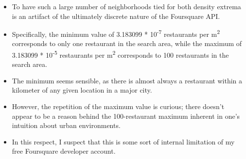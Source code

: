 \documentclass[aspectratio=169]{beamer}
\begin{document}
\begin{frame}

\begin{itemize}
 \item To have such a large number of neighborhoods tied for both density extrema is an artifact of the ultimately discrete nature of the Foursquare API.
 \item Specifically, the minimum value of 3.183099 * 10\textsuperscript{-7} restaurants per m\textsuperscript{2} corresponds to only one restaurant in the search area, while the maximum of 3.183099 * 10\textsuperscript{-5} restaurants per m\textsuperscript{2} corresponds to 100 restaurants in the search area.
 \item The minimum seems sensible, as there is almost always a restaurant within a kilometer of any given location in a major city.
 \item However, the repetition of the maximum value is curious; there doesn't appear to be a reason behind the 100-restaurant maximum inherent in one's intuition about urban environments.
 \item In this respect, I suspect that this is some sort of internal limitation of my free Foursquare developer account.
\end{itemize}

% 
% 
% 
\end{frame}
\end{document}
